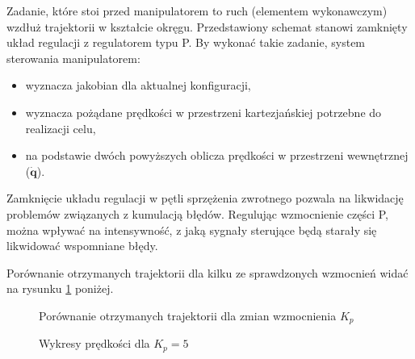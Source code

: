 \documentclass[11pt, a4paper]{article}
\begin{document}
Zadanie, które stoi przed manipulatorem to ruch (elementem wykonawczym) wzdłuż trajektorii w kształcie okręgu. Przedstawiony schemat stanowi zamknięty układ regulacji z regulatorem typu P. By wykonać takie zadanie, system sterowania manipulatorem:
\begin{itemize}
\item wyznacza jakobian dla aktualnej konfiguracji,
\item wyznacza pożądane prędkości w przestrzeni kartezjańskiej potrzebne do realizacji celu,
\item na podstawie dwóch powyższych oblicza prędkości w przestrzeni wewnętrznej ($\dot{\mathbf{q}}$).
\end{itemize}

Zamknięcie układu regulacji w pętli sprzężenia zwrotnego pozwala na likwidację problemów związanych z kumulacją błędów. Regulując wzmocnienie części P, można wpływać na intensywność, z jaką sygnały sterujące będą starały się likwidować wspomniane błędy.

Porównanie otrzymanych trajektorii dla kilku ze sprawdzonych wzmocnień widać na rysunku \ref{fig:jacobianP} poniżej.
\begin{figure}[p!]
	\centering
	
	\hfill%
	\hfill%
	
	\hfill%
	\hfill%
	
	\caption{Porównanie otrzymanych trajektorii dla zmian wzmocnienia $K_p$ \label{fig:jacobianP}}
\end{figure}

\begin{figure}[p!]
	\centering
	
	\hfill%
	
	\caption{Wykresy prędkości dla $K_p = 5$ \label{fig:jacobianQV}}
\end{figure}
\end{document}

